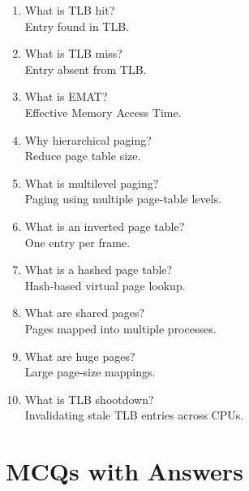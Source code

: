 \begin{enumerate}
\item What is TLB hit?\\
Entry found in TLB.

\item What is TLB miss?\\
Entry absent from TLB.

\item What is EMAT?\\
Effective Memory Access Time.

\item Why hierarchical paging?\\
Reduce page table size.

\item What is multilevel paging?\\
Paging using multiple page-table levels.

\item What is an inverted page table?\\
One entry per frame.

\item What is a hashed page table?\\
Hash-based virtual page lookup.

\item What are shared pages?\\
Pages mapped into multiple processes.

\item What are huge pages?\\
Large page-size mappings.

\item What is TLB shootdown?\\
Invalidating stale TLB entries across CPUs.
\end{enumerate}

\section{MCQs with Answers}

